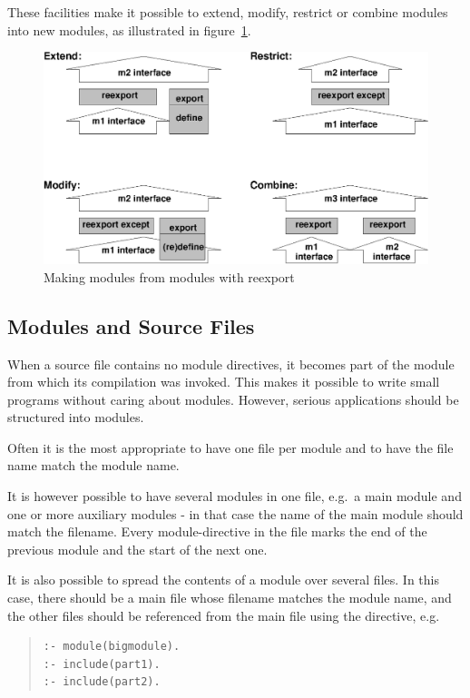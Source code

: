 These facilities make it possible to extend, modify, restrict or
combine modules into new modules, as illustrated in figure~\ref{reexport}. 

\begin{figure}[hbt]
\begin{center}
\includegraphics{reexport.eps}
\end{center}
\caption{Making modules from modules with reexport}
\label{reexport}
\end{figure}


\subsection{Modules and Source Files}

When a source file contains no module directives, it becomes part of
the module from which its compilation was invoked.  This makes it
possible to write small programs without caring about modules. 
However, serious applications should be structured into modules. 

Often it is the most appropriate to have one file per module and to
have the file name match the module name.

It is however possible to have several modules in one file, e.g.\ a
main module and one or more auxiliary modules - in that
case the name of the main module should match the filename.
Every module-directive in the file marks the end of the previous
module and the start of the next one.

It is also possible to spread the contents of a module over several
files. In this case, there should be a main file whose filename
matches the module name, and the other files should be referenced
from the main file using the  directive, e.g.
\begin{quote}\begin{verbatim}
:- module(bigmodule).
:- include(part1).
:- include(part2).
\end{verbatim}\end{quote}



